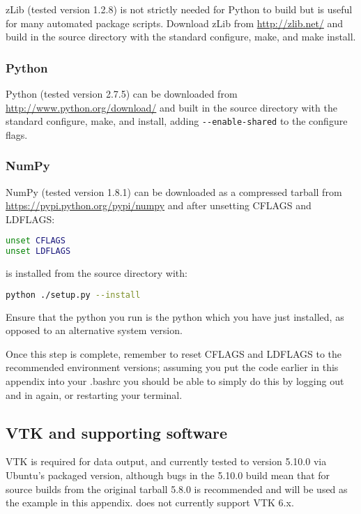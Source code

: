 zLib (tested version 1.2.8) is not strictly needed for Python to build but is
useful for many automated package scripts. Download zLib from
\url{http://zlib.net/} and build in the source directory with the standard
configure, make, and make install.

\subsubsection{Python}
\label{sec:required_libraries_python_python}

Python (tested version 2.7.5) can be downloaded from
\url{http://www.python.org/download/} and built in the source directory with
the standard configure, make, and install, adding
\lstinline[language=bash]+--enable-shared+ to the configure flags.

\subsubsection{NumPy}
\label{sec:required_libraries_python_numpy}

NumPy (tested version 1.8.1) can be downloaded as a compressed tarball from
\url{https://pypi.python.org/pypi/numpy} and after unsetting CFLAGS and
LDFLAGS:

\begin{lstlisting}[language=bash]
unset CFLAGS
unset LDFLAGS
\end{lstlisting}

is installed from the source directory with:

\begin{lstlisting}[language=bash]
python ./setup.py --install
\end{lstlisting}

Ensure that the python you run is the python which you have just installed, as
opposed to an alternative system version.

Once this step is complete, remember to reset CFLAGS and LDFLAGS to the
recommended environment versions; assuming you put the code earlier in this
appendix into your .bashrc you should be able to simply do this by logging out
and in again, or restarting your terminal.

\subsection{VTK and supporting software}
\label{sec:required_libraries_vtk}

VTK is required for \fluidity data output, and currently tested to version
5.10.0 via Ubuntu's packaged version, although bugs in the 5.10.0 build mean
that for source builds from the original tarball 5.8.0 is recommended and will
be used as the example in this appendix. \fluidity does not currently support
VTK 6.x.

